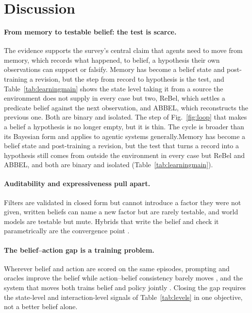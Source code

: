 \section{Discussion}
\label{sec:discussion}

\ifnature\fi

\paragraph{From memory to testable belief: the test is scarce.}
\ifnature The evidence supports the survey's central claim that agents need to move from memory, which records what happened, to belief, a hypothesis their own observations can support or falsify. Memory has become a belief state and post-training a revision, but the step from record to hypothesis is the test, and Table~\ref{tab:learningmain} shows the state level taking it from a source the environment does not supply in every case but two, ReBel, which settles a predicate belief against the next observation, and ABBEL, which reconstructs the previous one. Both are binary and isolated. The step of Fig.~\ref{fig:loop} that makes a belief a hypothesis is no longer empty, but it is thin. The cycle is broader than its Bayesian form and applies to agentic systems generally.\else Memory has become a belief state and post-training a revision, but the test that turns a record into a hypothesis still comes from outside the environment in every case but ReBel and ABBEL, and both are binary and isolated (Table~\ref{tab:learningmain}).\fi

\paragraph{Auditability and expressiveness pull apart.}
Filters are validated in closed form but cannot introduce a factor they were not given, written beliefs can name a new factor but are rarely testable, and world models are testable but mute. Hybrids that write the belief and check it parametrically are the convergence point \citep{song2026agent,zhang2026selfevolvingx,kumar2026towards}.

\paragraph{The belief--action gap is a training problem.}
Wherever belief and action are scored on the same episodes, prompting and oracles improve the belief while action--belief consistency barely moves \citep{deb2026stocktake,gao2026auditing}, and the system that moves both trains belief and policy jointly \citep{singh2026agent}. Closing the gap requires the state-level and interaction-level signals of Table~\ref{tab:levels} in one objective, not a better belief alone.
